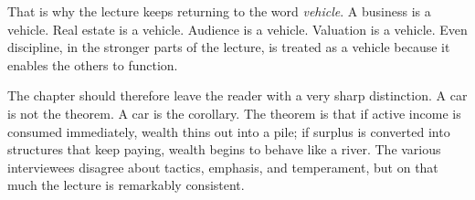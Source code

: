 That is why the lecture keeps returning to the word \emph{vehicle}. A business is a vehicle. Real estate is a vehicle. Audience is a vehicle. Valuation is a vehicle. Even discipline, in the stronger parts of the lecture, is treated as a vehicle because it enables the others to function.

The chapter should therefore leave the reader with a very sharp distinction. A car is not the theorem. A car is the corollary. The theorem is that if active income is consumed immediately, wealth thins out into a pile; if surplus is converted into structures that keep paying, wealth begins to behave like a river. The various interviewees disagree about tactics, emphasis, and temperament, but on that much the lecture is remarkably consistent.